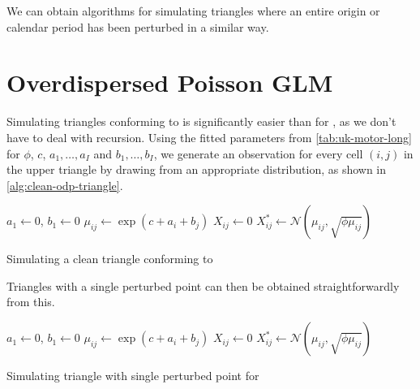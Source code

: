 \documentclass[a4paper]{book}
\begin{document}
We can obtain algorithms for simulating triangles where an entire origin or calendar period has been perturbed in a similar way.

\section{Overdispersed Poisson GLM}

Simulating triangles conforming to  is significantly easier than for , as we don't have to deal with recursion. Using the fitted parameters from \cref{tab:uk-motor-long} for $\phi$, $c$, $a_1, \dots, a_I$ and $b_1, \dots, b_I$, we generate an observation for every cell $(i, j)$ in the upper triangle by drawing from an appropriate distribution, as shown in \cref{alg:clean-odp-triangle}.

\begin{algorithm}[H]
  \begin{algorithmic}
    \State $a_1 \gets 0$, $b_1 \gets 0$
      \State $\mu_{ij} \gets \exp(c + a_i + b_j)$
      \State $X_{ij} \gets 0$
    \EndFor
        \State $X^*_{ij} \gets \mathcal{N}(\mu_{ij}, \sqrt{\phi \mu_{ij}})$
      \EndFor
    \EndFor
    \State {}
  \end{algorithmic}
  \caption{Simulating a clean triangle conforming to }
  \label{alg:clean-odp-triangle}
\end{algorithm}

Triangles with a single perturbed point can then be obtained straightforwardly from this.

\begin{algorithm}[H]
  \begin{algorithmic}
    \State $a_1 \gets 0$, $b_1 \gets 0$
      \State $\mu_{ij} \gets \exp(c + a_i + b_j)$
      \State $X_{ij} \gets 0$
    \EndFor
        \State $X^*_{ij} \gets \mathcal{N}(\mu_{ij}, \sqrt{\phi \mu_{ij}})$
      \EndFor
    \EndFor
    \State {}
  \end{algorithmic}
  \caption{Simulating triangle with single perturbed point for }
\end{algorithm}
\end{document}
